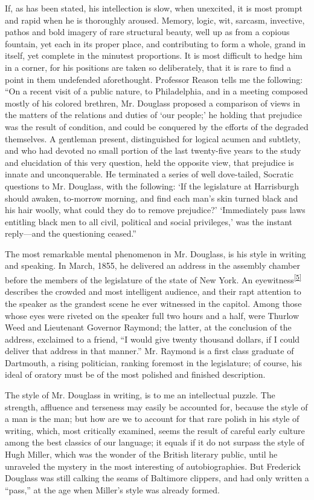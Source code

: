 If, as has been stated, his intellection is slow, when unexcited, it is
most prompt and rapid when he is thoroughly aroused. Memory, logic, wit,
sarcasm, invective, pathos and bold imagery of rare structural beauty,
well up as from a copious fountain, yet each in its proper place, and
contributing to form a whole, grand in itself, yet complete in the
minutest proportions. It is most difficult to hedge him in a corner, for
his positions are taken so deliberately, that it is rare to find a point
in them undefended aforethought. Professor Reason tells me the
following: ``On a recent visit of a public nature, to Philadelphia, and
in a meeting composed mostly of his colored brethren, Mr. Douglass
proposed a comparison of views in the matters of the relations and
duties of `our people;' he holding that prejudice was the result of
condition, and could be conquered by the efforts of the degraded
themselves. A gentleman present, distinguished for logical acumen and
subtlety, and who had devoted no small portion of the last twenty-five
years to the study and elucidation of this very question, held the
opposite view, that prejudice is innate and unconquerable. He terminated
a series of well dove-tailed, Socratic questions to Mr. Douglass, with
the following: `If the legislature at Harrisburgh should awaken,
to-morrow morning, and find each man's skin turned black and his hair
woolly, what could they do to remove prejudice?' `Immediately pass laws
entitling black men to all civil, political and social privileges,' was
the instant reply---and the questioning ceased.''

The most remarkable mental phenomenon in Mr. Douglass, is his style in
writing and speaking. In March, 1855, he delivered an address in the
assembly chamber before the members of the legislature of the state of
New York. An
eyewitness\textsuperscript{\protect\hyperlink{cite_note-5}{{[}5{]}}}
describes the crowded and most intelligent audience, and their rapt
attention to the speaker {}as the grandest scene he ever witnessed in
the capitol. Among those whose eyes were riveted on the speaker full two
hours and a half, were Thurlow Weed and Lieutenant Governor Raymond; the
latter, at the conclusion of the address, exclaimed to a friend, ``I
would give twenty thousand dollars, if I could deliver that address in
that manner.'' Mr. Raymond is a first class graduate of Dartmouth, a
rising politician, ranking foremost in the legislature; of course, his
ideal of oratory must be of the most polished and finished description.

The style of Mr. Douglass in writing, is to me an intellectual puzzle.
The strength, affluence and terseness may easily be accounted for,
because the style of a man is the man; but how are we to account for
that rare polish in his style of writing, which, most critically
examined, seems the result of careful early culture among the best
classics of our language; it equals if it do not surpass the style of
Hugh Miller, which was the wonder of the British literary public, until
he unraveled the mystery in the most interesting of autobiographies. But
Frederick Douglass was still calking the seams of Baltimore clippers,
and had only written a ``pass,'' at the age when Miller's style was
already formed.

